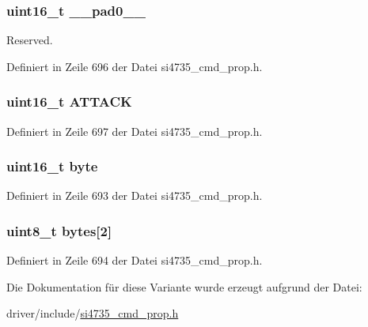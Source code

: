 \subsubsection[{\+\_\+\+\_\+pad0\+\_\+\+\_\+}]{\setlength{\rightskip}{0pt plus 5cm}uint16\+\_\+t \+\_\+\+\_\+pad0\+\_\+\+\_\+}\label{unionfm__soft__mute__atk__rate_a77132c2c26a75f5b8751b235cda23828}


Reserved. 



Definiert in Zeile 696 der Datei si4735\+\_\+cmd\+\_\+prop.\+h.

\hypertarget{unionfm__soft__mute__atk__rate_a23a6aee9d921440c53996214126047a3}{}
\subsubsection[{A\+T\+T\+A\+C\+K}]{\setlength{\rightskip}{0pt plus 5cm}uint16\+\_\+t A\+T\+T\+A\+C\+K}\label{unionfm__soft__mute__atk__rate_a23a6aee9d921440c53996214126047a3}


Definiert in Zeile 697 der Datei si4735\+\_\+cmd\+\_\+prop.\+h.

\hypertarget{unionfm__soft__mute__atk__rate_ab0549c1b5ea980a02e7eab77e21fea49}{}
\subsubsection[{byte}]{\setlength{\rightskip}{0pt plus 5cm}uint16\+\_\+t byte}\label{unionfm__soft__mute__atk__rate_ab0549c1b5ea980a02e7eab77e21fea49}


Definiert in Zeile 693 der Datei si4735\+\_\+cmd\+\_\+prop.\+h.

\hypertarget{unionfm__soft__mute__atk__rate_a46e4c05d20a047ec169f60d3167e912e}{}
\subsubsection[{bytes}]{\setlength{\rightskip}{0pt plus 5cm}uint8\+\_\+t bytes\mbox{[}2\mbox{]}}\label{unionfm__soft__mute__atk__rate_a46e4c05d20a047ec169f60d3167e912e}


Definiert in Zeile 694 der Datei si4735\+\_\+cmd\+\_\+prop.\+h.



Die Dokumentation für diese Variante wurde erzeugt aufgrund der Datei\+:\begin{DoxyCompactItemize}
\item 
driver/include/\hyperlink{si4735__cmd__prop_8h}{si4735\+\_\+cmd\+\_\+prop.\+h}\end{DoxyCompactItemize}
